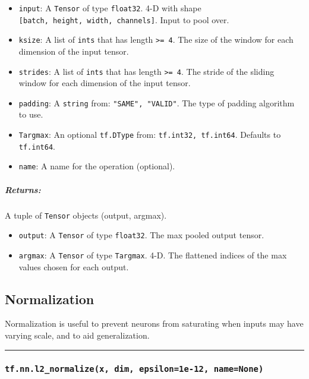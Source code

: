 \begin{itemize}
\tightlist
\item
  \texttt{input}: A \texttt{Tensor} of type \texttt{float32}. 4-D with
  shape \texttt{{[}batch,\ height,\ width,\ channels{]}}. Input to pool
  over.
\item
  \texttt{ksize}: A list of \texttt{ints} that has length
  \texttt{\textgreater{}=\ 4}. The size of the window for each dimension
  of the input tensor.
\item
  \texttt{strides}: A list of \texttt{ints} that has length
  \texttt{\textgreater{}=\ 4}. The stride of the sliding window for each
  dimension of the input tensor.
\item
  \texttt{padding}: A \texttt{string} from: \texttt{"SAME",\ "VALID"}.
  The type of padding algorithm to use.
\item
  \texttt{Targmax}: An optional \texttt{tf.DType} from:
  \texttt{tf.int32,\ tf.int64}. Defaults to \texttt{tf.int64}.
\item
  \texttt{name}: A name for the operation (optional).
\end{itemize}

\subparagraph{Returns: }\label{returns-12}

A tuple of \texttt{Tensor} objects (output, argmax).

\begin{itemize}
\tightlist
\item
  \texttt{output}: A \texttt{Tensor} of type \texttt{float32}. The max
  pooled output tensor.
\item
  \texttt{argmax}: A \texttt{Tensor} of type \texttt{Targmax}. 4-D. The
  flattened indices of the max values chosen for each output.
\end{itemize}

\subsection{Normalization }\label{normalization}

Normalization is useful to prevent neurons from saturating when inputs
may have varying scale, and to aid generalization.

\begin{center}\rule{0.5\linewidth}{\linethickness}\end{center}

\subsubsection{\texorpdfstring{\texttt{tf.nn.l2\_normalize(x,\ dim,\ epsilon=1e-12,\ name=None)}
}{tf.nn.l2\_normalize(x, dim, epsilon=1e-12, name=None) }}\label{tf.nn.l2ux5fnormalizex-dim-epsilon1e-12-namenone}

